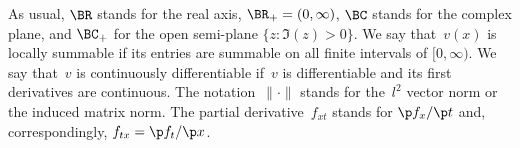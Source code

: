 As usual, $\BR$ stands for the real axis,
$\BR_+=(0, \infty)$,
$\BC$ stands for the complex plane, and
$\BC_+$ for the open semi-plane $\{z\colon \Im(z)>0\}$.
We say that~$v(x)$ is locally summable if its entries are summable on all f\/inite intervals of $[0, \infty)$.
We say that~$v$ is continuously dif\/ferentiable
if~$v$ is dif\/ferentiable and its f\/irst derivatives are continuous.
The notation~$\| \cdot \|$ stands for the~$l^2$ vector norm or the induced matrix norm.
The partial derivative~$f_{xt}$ stands for $\p f_x / \p t$ and, correspondingly, $f_{tx} = \p f_t / \p x$.
